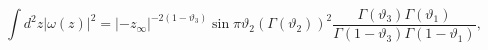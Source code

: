 \begin{equation}
\label{integral}
\int d^{2}z|\omega(z)|^{2}=|-z_{\infty}|^{-2(1-\vartheta_{3})}\sin \pi\vartheta_{2} (\Gamma(\vartheta_{2}))^{2}\frac{\Gamma(\vartheta_{3})\Gamma(\vartheta_{1})}{\Gamma(1-\vartheta_{3})\Gamma(1-\vartheta_{1})},
\end{equation}

